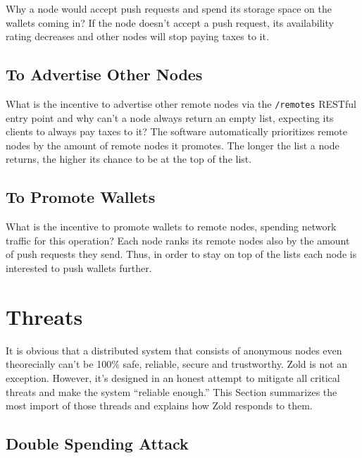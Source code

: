 \documentclass[11pt,oneside]{article}
\newcommand\dd[1]{\colorbox{gray!30}{\texttt{#1}}}
\begin{document}
Why a node would accept push requests and spend its storage space
on the wallets coming in? If the node doesn't accept a push request,
its availability rating decreases and other nodes will stop paying
taxes to it.

\subsection{To Advertise Other Nodes}

What is the incentive to advertise other remote nodes via the \dd{/remotes} RESTful
entry point and why can't a node always return an empty list, expecting its clients
to always pay taxes to it? The software automatically prioritizes remote
nodes by the amount of remote nodes it promotes. The longer the list a node
returns, the higher its chance to be at the top of the list.

\subsection{To Promote Wallets}

What is the incentive to promote wallets to remote nodes, spending network
traffic for this operation? Each node ranks its remote nodes also by the
amount of push requests they send. Thus, in order to stay on top of the lists
each node is interested to push wallets further.


\section{Threats}

It is obvious that a distributed system that consists of anonymous nodes
even theorecially can't be 100\% safe, reliable, secure and trustworthy.
Zold is not an exception. However, it's designed in an honest attempt
to mitigate all critical threats and make the system ``reliable enough.''
This Section summarizes the most import of those threads and explains
how Zold responds to them.

\subsection{Double Spending Attack}
\end{document}
